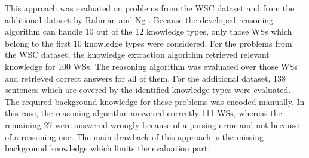 This approach was evaluated on problems from the WSC dataset and from the additional dataset by Rahman and Ng \cite{DBLP:conf/emnlp/RahmanN12}. Because the developed reasoning algorithm can handle 10 out of the 12 knowledge types, only those WSs which belong to the first 10 knowledge types were considered. For the problems from the WSC dataset, the knowledge extraction algorithm retrieved relevant knowledge for 100 WSs. The reasoning algorithm was evaluated over those WSs and retrieved correct answers for all of them.  
For the additional dataset, 138 sentences which are covered by the identified knowledge types were evaluated. The required background knowledge for these problems was encoded manually. In this case, the reasoning algorithm answered correctly 111 WSs, whereas the remaining 27 were answered wrongly because of a parsing error and not because of a reasoning one. The main drawback of this approach is the missing background knowledge which limits the evaluation part. 
 
